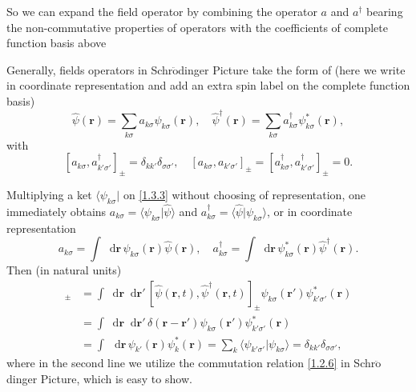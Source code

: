 \documentclass[b5paper,10pt,UTF8]{book}
\newcommand*\dd{\mathop{}\!\mathrm{d}}
\numberwithin{equation}{section}
\begin{document}
		So we can expand the field operator by combining the operator $a$ and $a^\dagger$ bearing the non-commutative properties of operators with the coefficients of complete function basis above
		\begin{Assertion}
			Generally, fields operators in Schr$\ddot{\text{o}}$dinger Picture take the form of (here we write in coordinate representation and add an extra spin label on the complete function basis) 
			\begin{equation}\label{1.3.3}
				\hat{\psi}(\bm{r})=\sum_{k\sigma}a_{k\sigma}\psi_{k\sigma}(\bm{r}),\quad\hat{\psi}^\dagger(\bm{r})=\sum_{k\sigma}a^\dagger_{k\sigma}\psi^*_{k\sigma}(\bm{r}),
			\end{equation}
			with 
			\begin{equation}\label{1.3.4}
				[a_{k\sigma},a_{k'\sigma'}^\dagger]_{\pm}=\delta_{kk'}\delta_{\sigma\sigma'},\quad[a_{k\sigma},a_{k'\sigma'}]_{\pm}=[a^\dagger_{k\sigma},a^\dagger_{k'\sigma'}]_{\pm}=0.
			\end{equation}
		\end{Assertion}
		\begin{Proof}
			Multiplying a ket $\langle\psi_{k\sigma}|$ on \eqref{1.3.3} without choosing of representation, one immediately obtains $a_{k\sigma}=\langle\psi_{k\sigma}|\hat{\psi}\rangle$ and $a_{k\sigma}^\dagger=\langle\hat{\psi}|\psi_{k\sigma}\rangle$, or in coordinate representation
			$$a_{k\sigma}=\int\dd\bm{r}\,\psi_{k\sigma}(\bm{r})\hat{\psi}(\bm{r}),\quad a^\dagger_{k\sigma}=\int\dd\bm{r}\,\psi^*_{k\sigma}(\bm{r})\hat{\psi}^\dagger(\bm{r}).$$
			Then (in natural units)
			\begin{align*}
				[a_{k\sigma},a^\dagger_{k'\sigma'}]_{\pm}&=\int\dd\bm{r}\dd\bm{r'}\,[\hat{\psi}(\bm{r},t),\hat{\psi}^\dagger(\bm{r},t)]_{\pm}\psi_{k\sigma}(\bm{r'})\psi^*_{k'\sigma'}(\bm{r})\\
				&=\int\dd\bm{r}\dd\bm{r'}\,\delta(\bm{r}-\bm{r'})\psi_{k\sigma}(\bm{r'})\psi^*_{k'\sigma'}(\bm{r})\\
				&=\int\,\dd\bm{r}\,\psi_{k'}(\bm{r})\psi_k^*(\bm{r})=\sum_k\langle\psi_{k'\sigma'}|\psi_{k\sigma}\rangle=\delta_{kk'}\delta_{\sigma\sigma'},
			\end{align*}
			where in the second line we utilize the commutation relation \eqref{1.2.6} in Schr$\ddot{\text{o}}$dinger Picture, which is easy to show.
		\end{Proof}
\end{document}
